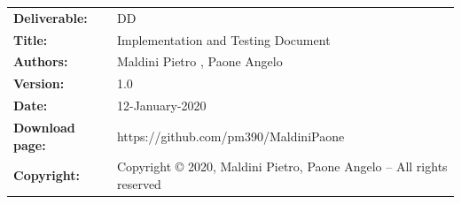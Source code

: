 \begin{table}[h!]
\begin{tabu} to \textwidth { X[0.3,r,p] X[0.7,l,p] }
\hline

\textbf{Deliverable:} & DD\\
\textbf{Title:} & Implementation and Testing Document \\
\textbf{Authors:} & Maldini Pietro , Paone Angelo \\
\textbf{Version:} & 1.0 \\ 
\textbf{Date:} & 12-January-2020 \\
\textbf{Download page:} & https://github.com/pm390/MaldiniPaone\\
\textbf{Copyright:} & Copyright © 2020, Maldini Pietro, Paone Angelo – All rights reserved \\
\hline
\end{tabu}
\end{table}




\setcounter{page}{2}


\newpage
{}
\tableofcontents


\clearpage
{}
\label{sect:introduction}


\clearpage
{}
\label{sect:Requirements and Functions}


\clearpage
{}
\label{sect:Development Choices}


